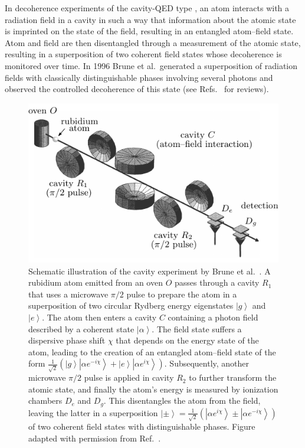 \documentclass[3p,sort&compress]{elsarticle}
\newcommand{\ket}[1]{\left\vert{#1}\right\rangle}
\newcommand{\E}{\ensuremath{e}}
\newcommand{\I}{\ensuremath{i}}
\begin{document}
In decoherence experiments of the cavity-QED type \cite{Raimond:2001:aa,Haroche:2006:hh}, an atom interacts with a radiation field in a cavity in such a way that information about the atomic state is imprinted on the state of the field, resulting in an entangled atom--field state. Atom and field are then disentangled through a measurement of the atomic state, resulting in a superposition of two coherent field states whose decoherence is monitored over time. In 1996 Brune et al.\ generated a superposition of radiation fields with classically distinguishable phases involving several photons and observed the controlled decoherence of this state \cite{Brune:1996:om,Raimond:2001:aa,Kaiser:2001:tm} (see Refs.~\cite{Raimond:2001:aa,Haroche:2006:hh} for reviews). 

\begin{figure}
\centering
\includegraphics[scale=0.9]{brunesetup2.pdf}
\caption{Schematic illustration of the cavity experiment by Brune et al.\
  \cite{Brune:1996:om}. A rubidium atom emitted from an oven $O$ passes through a cavity $R_1$ that uses a microwave $\pi/2$ pulse to prepare the atom in a superposition of two circular Rydberg energy eigenstates $\ket{g}$ and $\ket{e}$. The atom then enters a cavity $C$ containing a photon field described by a coherent state $\ket{\alpha}$. The field state suffers a dispersive phase shift $\chi$ that depends on the energy state of the atom, leading to the creation of an entangled atom--field state of the form $\frac{1}{\sqrt{2}} \left( \ket{g} \ket{\alpha \E^{-\I \chi} } + \ket{e} \ket{\alpha \E^{\I \chi}} \right)$. Subsequently, another microwave $\pi/2$ pulse is applied in cavity $R_2$ to further transform the atomic state, and finally the atom's energy is measured by ionization chambers $D_e$ and $D_g$. This disentangles the atom from the field, leaving the latter in a superposition $\ket{\pm}=\frac{1}{\sqrt{2}} \left( \ket{\alpha \E^{\I \chi}} \pm \ket{\alpha \E^{-\I \chi}} \right)$ of two coherent field states with distinguishable phases.  Figure adapted with permission from Ref.~\cite{Davidovich:1996:sa}.}
\label{fig:brune-setup}
\end{figure}
\end{document}
